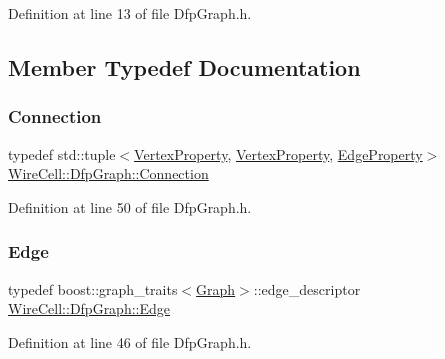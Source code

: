Definition at line 13 of file Dfp\+Graph.\+h.



\subsection{Member Typedef Documentation}
\mbox{\label{struct_wire_cell_1_1_dfp_graph_a2411a46952a0b08b986e57ce0100ce21}} 
\subsubsection{\texorpdfstring{Connection}{Connection}}
{\footnotesize\ttfamily typedef std\+::tuple$<$\hyperlink{struct_wire_cell_1_1_dfp_graph_1_1_vertex_property}{Vertex\+Property}, \hyperlink{struct_wire_cell_1_1_dfp_graph_1_1_vertex_property}{Vertex\+Property}, \hyperlink{struct_wire_cell_1_1_dfp_graph_1_1_edge_property}{Edge\+Property}$>$ \hyperlink{struct_wire_cell_1_1_dfp_graph_a2411a46952a0b08b986e57ce0100ce21}{Wire\+Cell\+::\+Dfp\+Graph\+::\+Connection}}



Definition at line 50 of file Dfp\+Graph.\+h.

\mbox{\label{struct_wire_cell_1_1_dfp_graph_af3fc4fb6130bbad095ffe90480d59998}} 
\subsubsection{\texorpdfstring{Edge}{Edge}}
{\footnotesize\ttfamily typedef boost\+::graph\+\_\+traits$<$\hyperlink{struct_wire_cell_1_1_dfp_graph_ad5dd2546b355a72f5f24e90a985a45e9}{Graph}$>$\+::edge\+\_\+descriptor \hyperlink{struct_wire_cell_1_1_dfp_graph_af3fc4fb6130bbad095ffe90480d59998}{Wire\+Cell\+::\+Dfp\+Graph\+::\+Edge}}



Definition at line 46 of file Dfp\+Graph.\+h.

\mbox{\label{struct_wire_cell_1_1_dfp_graph_ad5dd2546b355a72f5f24e90a985a45e9}} 
